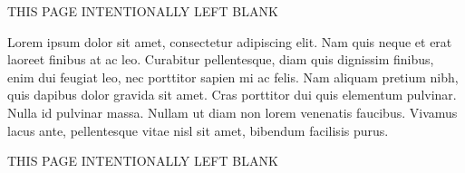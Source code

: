 
\cleardoublepage

\newpage 
\hbox{}\par\vfill\centerline%
{THIS PAGE INTENTIONALLY LEFT BLANK}%
\vfill
\newpage

\setcounter{savepage}{\thepage}
\begin{abstractpage}
Lorem ipsum dolor sit amet, consectetur adipiscing elit. Nam quis neque et erat laoreet finibus at ac leo. Curabitur pellentesque, diam quis dignissim finibus, enim dui feugiat leo, nec porttitor sapien mi ac felis. Nam aliquam pretium nibh, quis dapibus dolor gravida sit amet. Cras porttitor dui quis elementum pulvinar. Nulla id pulvinar massa. Nullam ut diam non lorem venenatis faucibus. Vivamus lacus ante, pellentesque vitae nisl sit amet, bibendum facilisis purus.
\end{abstractpage}

% 

\newpage 
\hbox{}\par\vfill\centerline%
{THIS PAGE INTENTIONALLY LEFT BLANK}%
\vfill
\newpage

\cleardoublepage